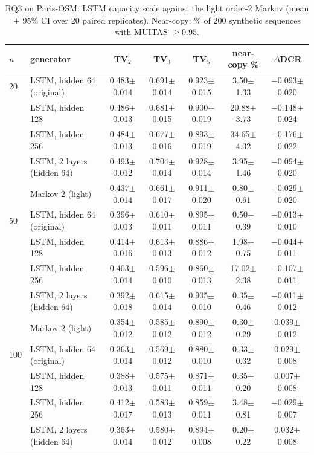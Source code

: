\begin{table}[!t]
\caption{RQ3 on Paris-OSM: LSTM capacity scale against the light order-2 Markov (mean $\pm$ 95\% CI over 20 paired replicates). Near-copy: \% of 200 synthetic sequences with MUITAS $\ge 0.95$.}
\label{tab:supp-capacity}
\centering\scriptsize
\begin{tabular}{llccccc}
\toprule
$n$ & generator & TV$_2$ & TV$_3$ & TV$_5$ & near-copy \% & $\Delta$DCR \\
\midrule
20 & LSTM, hidden 64 (original) & 0.483$\pm$0.014 & 0.691$\pm$0.014 & 0.923$\pm$0.015 & 3.50$\pm$1.33 & $-$0.093$\pm$0.020 \\
 & LSTM, hidden 128 & 0.486$\pm$0.013 & 0.681$\pm$0.015 & 0.900$\pm$0.019 & 20.88$\pm$3.73 & $-$0.148$\pm$0.024 \\
 & LSTM, hidden 256 & 0.484$\pm$0.013 & 0.677$\pm$0.016 & 0.893$\pm$0.019 & 34.65$\pm$4.32 & $-$0.176$\pm$0.022 \\
 & LSTM, 2 layers (hidden 64) & 0.493$\pm$0.012 & 0.704$\pm$0.014 & 0.928$\pm$0.014 & 3.95$\pm$1.46 & $-$0.094$\pm$0.020 \\
 & Markov-2 (light) & 0.437$\pm$0.014 & 0.661$\pm$0.017 & 0.911$\pm$0.020 & 0.80$\pm$0.61 & $-$0.029$\pm$0.020 \\
\midrule
50 & LSTM, hidden 64 (original) & 0.396$\pm$0.013 & 0.610$\pm$0.011 & 0.895$\pm$0.011 & 0.50$\pm$0.39 & $-$0.013$\pm$0.010 \\
 & LSTM, hidden 128 & 0.414$\pm$0.016 & 0.613$\pm$0.013 & 0.886$\pm$0.012 & 1.98$\pm$0.75 & $-$0.044$\pm$0.011 \\
 & LSTM, hidden 256 & 0.403$\pm$0.014 & 0.596$\pm$0.010 & 0.860$\pm$0.013 & 17.02$\pm$2.38 & $-$0.107$\pm$0.011 \\
 & LSTM, 2 layers (hidden 64) & 0.392$\pm$0.018 & 0.615$\pm$0.014 & 0.905$\pm$0.010 & 0.35$\pm$0.46 & $-$0.011$\pm$0.012 \\
 & Markov-2 (light) & 0.354$\pm$0.012 & 0.585$\pm$0.012 & 0.890$\pm$0.012 & 0.30$\pm$0.29 & 0.039$\pm$0.012 \\
\midrule
100 & LSTM, hidden 64 (original) & 0.363$\pm$0.014 & 0.569$\pm$0.012 & 0.880$\pm$0.010 & 0.33$\pm$0.32 & 0.029$\pm$0.008 \\
 & LSTM, hidden 128 & 0.388$\pm$0.013 & 0.575$\pm$0.011 & 0.871$\pm$0.011 & 0.35$\pm$0.20 & 0.007$\pm$0.008 \\
 & LSTM, hidden 256 & 0.412$\pm$0.017 & 0.583$\pm$0.013 & 0.859$\pm$0.011 & 3.48$\pm$0.81 & $-$0.029$\pm$0.007 \\
 & LSTM, 2 layers (hidden 64) & 0.363$\pm$0.014 & 0.580$\pm$0.012 & 0.894$\pm$0.008 & 0.20$\pm$0.22 & 0.032$\pm$0.008 \\

\end{tabular}
\end{table}
